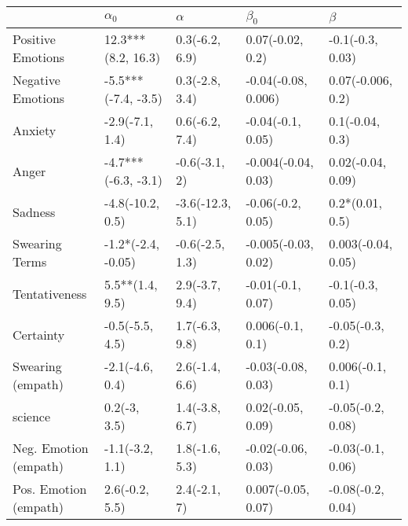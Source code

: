 \begin{tabular}{lllll}
\toprule
{} &           $\alpha_0$ &          $\alpha$ &            $\beta_0$ &             $\beta$ \\
\midrule
Positive Emotions     &   12.3***(8.2, 16.3) &    0.3(-6.2, 6.9) &     0.07(-0.02, 0.2) &    -0.1(-0.3, 0.03) \\
Negative Emotions     &  -5.5***(-7.4, -3.5) &    0.3(-2.8, 3.4) &  -0.04(-0.08, 0.006) &   0.07(-0.006, 0.2) \\
Anxiety               &      -2.9(-7.1, 1.4) &    0.6(-6.2, 7.4) &    -0.04(-0.1, 0.05) &     0.1(-0.04, 0.3) \\
Anger                 &  -4.7***(-6.3, -3.1) &     -0.6(-3.1, 2) &  -0.004(-0.04, 0.03) &   0.02(-0.04, 0.09) \\
Sadness               &     -4.8(-10.2, 0.5) &  -3.6(-12.3, 5.1) &    -0.06(-0.2, 0.05) &     0.2*(0.01, 0.5) \\
Swearing Terms        &   -1.2*(-2.4, -0.05) &   -0.6(-2.5, 1.3) &  -0.005(-0.03, 0.02) &  0.003(-0.04, 0.05) \\
Tentativeness         &      5.5**(1.4, 9.5) &    2.9(-3.7, 9.4) &    -0.01(-0.1, 0.07) &    -0.1(-0.3, 0.05) \\
Certainty             &      -0.5(-5.5, 4.5) &    1.7(-6.3, 9.8) &     0.006(-0.1, 0.1) &    -0.05(-0.3, 0.2) \\
Swearing (empath)     &      -2.1(-4.6, 0.4) &    2.6(-1.4, 6.6) &   -0.03(-0.08, 0.03) &    0.006(-0.1, 0.1) \\
science               &         0.2(-3, 3.5) &    1.4(-3.8, 6.7) &    0.02(-0.05, 0.09) &   -0.05(-0.2, 0.08) \\
Neg. Emotion (empath) &      -1.1(-3.2, 1.1) &    1.8(-1.6, 5.3) &   -0.02(-0.06, 0.03) &   -0.03(-0.1, 0.06) \\
Pos. Emotion (empath) &       2.6(-0.2, 5.5) &      2.4(-2.1, 7) &   0.007(-0.05, 0.07) &   -0.08(-0.2, 0.04) \\
\bottomrule
\end{tabular}
